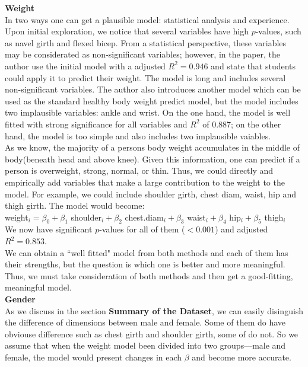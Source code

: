 \documentclass[11pt]{article}
\begin{document}
\textbf{Weight}\\ 
In two ways one can get a plausible model: statistical analysis and experience. Upon initial exploration, we notice that several variables have high $p$-values, such as navel girth and flexed bicep. From a statistical perspective, these variables may be considerated as non-significant variables; however, in the paper, the author use the initial model with a adjusted $R^2 = 0.946$ and state that students could apply it to predict their weight. The model is long and includes several non-significant variables. The author also introduces another model which can be used as the standard healthy body weight predict model, but the model includes two implausible variables: ankle and wrist. On the one hand, the model is well fitted with strong significance for all variables and $R^2$ of 0.887; on the other hand, the model is too simple and also includes two implausible vaiables.\\

As we know, the majority of a persons body weight accumulates in the middle of body(beneath head and above knee). Given this information, one can predict if a person is overweight, strong, normal, or thin. Thus, we could directly and empirically add variables that make a large contribution to the weight to the model. For example, we could include shoulder girth, chest diam, waist, hip and thigh girth. The model would become:\\

weight$_i = \beta_0 + \beta_1$ shoulder$_i + \beta_2$ chest.diam$_i + \beta_3$ waist$_i + \beta_4$ hip$_i + \beta_5$ thigh$_i$ \\

We now have significant $p$-values for all of them ($<0.001$) and adjusted $R^2 = 0.853$. \\

We can obtain a ``well fitted" model from both methods and each of them has their strengths, but the question is which one is better and more meaningful. Thus, we must  take consideration of both methods and then get a good-fitting, meaningful model.\\

\textbf{Gender}\\
As we discuss in the section \textbf{Summary of the Dataset}, we can easily disinguish the difference of dimensions between male and female. Some of them do have obviouse difference such as chest girth and shoulder girth, some of do not. So we assume that when the weight model been divided into two groups---male and female, the model would present changes in each $\beta$ and become more accurate.\\
\end{document}
